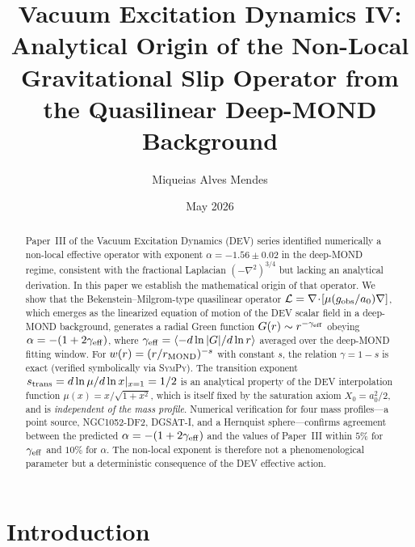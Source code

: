 \documentclass[aps,prd,twocolumn,superscriptaddress,nofootinbib]{revtex4-2}
\begin{document}
\title{Vacuum Excitation Dynamics IV: Analytical Origin of the
Non-Local Gravitational Slip Operator from the Quasilinear
Deep-MOND Background}

\author{Miqueias Alves Mendes}

\date{May 2026}

\begin{abstract}
Paper~III of the Vacuum Excitation Dynamics (DEV) series identified
numerically a non-local effective operator with exponent
$\alpha = -1.56 \pm 0.02$ in the deep-MOND regime, consistent with
the fractional Laplacian $(-\nabla^2)^{3/4}$ but lacking an
analytical derivation. In this paper we establish the mathematical
origin of that operator. We show that the Bekenstein--Milgrom-type
quasilinear operator $\mathcal{L} = \nabla\!\cdot\![\mu(g_{\rm obs}/a_0)\nabla]$,
which emerges as the linearized equation of motion of the DEV scalar
field in a deep-MOND background, generates a radial Green function
$G(r)\sim r^{-\gamma_{\rm eff}}$ obeying $\alpha = -(1+2\gamma_{\rm eff})$,
where $\gamma_{\rm eff} = \langle -d\ln|G|/d\ln r\rangle$ averaged over
the deep-MOND fitting window. For $w(r)=(r/r_{\rm MOND})^{-s}$ with
constant $s$, the relation $\gamma = 1-s$ is exact (verified
symbolically via \textsc{SymPy}). The transition exponent
$s_{\rm trans} = d\ln\mu/d\ln x|_{x=1}=1/2$ is an analytical property
of the DEV interpolation function $\mu(x)=x/\sqrt{1+x^2}$, which is
itself fixed by the saturation axiom $X_0 = a_0^2/2$, and is
\emph{independent of the mass profile}. Numerical verification for
four mass profiles---a point source, NGC1052-DF2, DGSAT-I, and a
Hernquist sphere---confirms agreement between the predicted
$\alpha = -(1+2\gamma_{\rm eff})$ and the values of Paper~III within
$5\%$ for $\gamma_{\rm eff}$ and $10\%$ for $\alpha$. The non-local
exponent is therefore not a phenomenological parameter but a
deterministic consequence of the DEV effective action.
\end{abstract}

\maketitle

\section{Introduction}\label{sec:intro}
\end{document}
